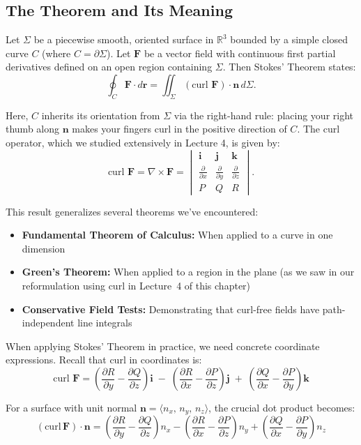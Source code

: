 \subsection*{The Theorem and Its Meaning}

\noindent Let $\Sigma$ be a piecewise smooth, oriented surface in $\mathbb{R}^3$ bounded by a simple closed curve $C$ (where $C = \partial \Sigma$). Let $\mathbf{F}$ be a vector field with continuous first partial derivatives defined on an open region containing $\Sigma$. Then Stokes' Theorem states:
\[
\oint_C \mathbf{F} \cdot d\mathbf{r} = \iint_\Sigma (\text{curl }\mathbf{F}) \cdot \mathbf{n}\,d\Sigma.
\]

\noindent Here, $C$ inherits its orientation from $\Sigma$ via the right-hand rule: placing your right thumb along $\mathbf{n}$ makes your fingers curl in the positive direction of $C$. The curl operator, which we studied extensively in Lecture 4, is given by:
\[
\text{curl }\mathbf{F} 
= \nabla \times \mathbf{F} 
= \begin{vmatrix}
\mathbf{i} & \mathbf{j} & \mathbf{k} \\
\frac{\partial}{\partial x} & \frac{\partial}{\partial y} & \frac{\partial}{\partial z} \\
P & Q & R
\end{vmatrix}.
\]

\noindent
This result generalizes several theorems we've encountered:
\begin{itemize}
    \item \textbf{Fundamental Theorem of Calculus:} When applied to a curve in one dimension
    \item \textbf{Green's Theorem:} When applied to a region in the plane (as we saw in our reformulation using curl in Lecture~4 of this chapter)
    \item \textbf{Conservative Field Tests:} Demonstrating that curl-free fields have path-independent line integrals
\end{itemize}

\noindent When applying Stokes' Theorem in practice, we need concrete coordinate expressions. Recall that curl in coordinates is:
\[
\text{curl }\mathbf{F} 
= \left( \frac{\partial R}{\partial y} - \frac{\partial Q}{\partial z} \right)\mathbf{i}
  \;-\;
  \left( \frac{\partial R}{\partial x} - \frac{\partial P}{\partial z} \right)\mathbf{j}
  \;+\;
  \left( \frac{\partial Q}{\partial x} - \frac{\partial P}{\partial y} \right)\mathbf{k}
\]

\noindent For a surface with unit normal $\mathbf{n} = \langle n_x,\,n_y,\,n_z \rangle$, the crucial dot product becomes:
\[
(\text{curl}\,\mathbf{F}) \cdot \mathbf{n} 
= \left( \frac{\partial R}{\partial y} - \frac{\partial Q}{\partial z} \right)n_x
 - \left( \frac{\partial R}{\partial x} - \frac{\partial P}{\partial z} \right)n_y
 + \left( \frac{\partial Q}{\partial x} - \frac{\partial P}{\partial y} \right)n_z
\]


